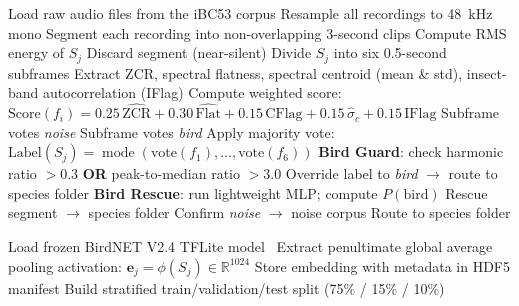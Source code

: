 \documentclass[a4paper,12pt]{article}
\begin{document}
\begin{algorithm}[H]
\caption{Preprocessing, Noise Segregation V2, Bird Guard, and Bird Rescue}
\begin{algorithmic}[1]
\STATE Load raw audio files from the iBC53 corpus
\STATE Resample all recordings to 48~kHz mono
\STATE Segment each recording into non-overlapping 3-second clips
    \STATE Compute RMS energy of $S_j$
        \STATE Discard segment (near-silent)
    \ELSE
        \STATE Divide $S_j$ into six 0.5-second subframes
            \STATE Extract ZCR, spectral flatness, spectral centroid (mean \& std), insect-band autocorrelation (IFlag)
            \STATE Compute weighted score:
                   $\mathrm{Score}(f_i) = 0.25\,\widehat{\mathrm{ZCR}}
                   + 0.30\,\widehat{\mathrm{Flat}}
                   + 0.15\,\mathrm{CFlag}
                   + 0.15\,\hat{\sigma}_c
                   + 0.15\,\mathrm{IFlag}$
                \STATE Subframe votes \textit{noise}
            \ELSE
                \STATE Subframe votes \textit{bird}
            \ENDIF
        \ENDFOR
        \STATE Apply majority vote: $\mathrm{Label}(S_j) = \operatorname{mode}(\mathrm{vote}(f_1),\ldots,\mathrm{vote}(f_6))$
            \STATE \textbf{Bird Guard}: check harmonic ratio $> 0.3$ \textbf{OR} peak-to-median ratio $> 3.0$
                \STATE Override label to \textit{bird} $\to$ route to species folder
            \ELSE
                \STATE \textbf{Bird Rescue}: run lightweight MLP; compute $P(\mathrm{bird})$
                    \STATE Rescue segment $\to$ species folder
                \ELSE
                    \STATE Confirm \textit{noise} $\to$ noise corpus
                \ENDIF
            \ENDIF
        \ELSE
            \STATE Route to species folder
        \ENDIF
    \ENDIF
\ENDFOR
\end{algorithmic}
\end{algorithm}

\vspace{0.4cm}

\begin{algorithm}[H]
\caption{BirdNET V2.4 Embedding Extraction}
\begin{algorithmic}[1]
\STATE Load frozen BirdNET V2.4 TFLite model~\cite{BirdNET}
    \STATE Extract penultimate global average pooling activation:
           $\mathbf{e}_j = \phi(S_j) \in \mathbb{R}^{1024}$
    \STATE Store embedding with metadata in HDF5 manifest
\ENDFOR
\STATE Build stratified train/validation/test split (75\% / 15\% / 10\%)
\end{algorithmic}
\end{algorithm}
\end{document}
